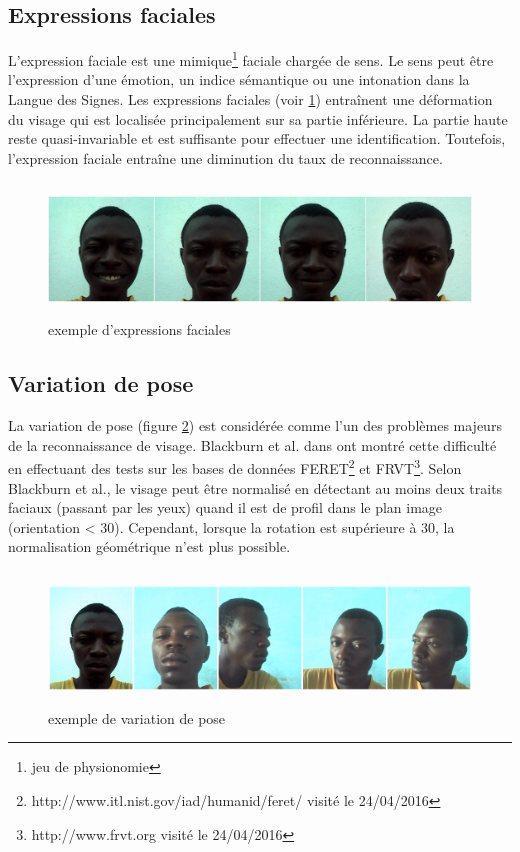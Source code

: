 \subsection{Expressions faciales}
L'expression  faciale  est  une  mimique\footnote{jeu de physionomie}  faciale  chargée  de  sens.  Le  sens  peut  être l'expression  d'une  émotion,  un  indice  sémantique  ou une  intonation  dans  la  Langue  des 
Signes. Les  expressions faciales (voir \ref{fig:expression}) entraînent une déformation du visage qui est localisée principalement sur sa partie inférieure. La partie haute reste quasi-invariable et est suffisante pour effectuer une identification. Toutefois, l'expression faciale entraîne une diminution du taux de reconnaissance.
\begin{figure}[htbp]
	\centering
		\includegraphics[height=100pt, width=400pt]{expression.jpg}
	\caption{exemple d'expressions faciales}
	\label{fig:expression}
\end{figure}
 
\subsection{Variation de pose}
La variation de pose (figure \ref{fig:pose}) est considérée comme l'un des problèmes majeurs de la reconnaissance de visage. Blackburn et al. dans \citep{Bla01} ont montré cette difficulté en effectuant des tests sur les bases de données FERET\footnote{http://www.itl.nist.gov/iad/humanid/feret/ visité le 24/04/2016} et FRVT\footnote{http://www.frvt.org visité le 24/04/2016}. Selon Blackburn et al., le visage peut être normalisé en détectant au moins  deux  traits  faciaux  (passant  par  les  yeux) quand il est de profil dans le plan image (orientation < 30\degres).  Cependant,  lorsque  la  rotation  est supérieure à 30\degres, la normalisation géométrique n'est plus possible.
\begin{figure}[htbp]
	\centering
		\includegraphics[height=100pt, width=400pt]{pose.jpg}
	\caption{exemple de variation de pose}
	\label{fig:pose}
\end{figure}
 
